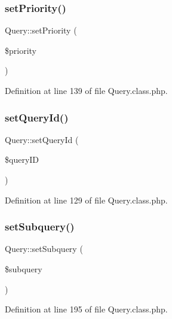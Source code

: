 \hypertarget{classQuery_a6bb27fe96006304e408d51171301c4b9}{}\label{classQuery_a6bb27fe96006304e408d51171301c4b9} 
\subsubsection{\texorpdfstring{set\+Priority()}{setPriority()}}
{\footnotesize\ttfamily Query\+::set\+Priority (\begin{DoxyParamCaption}\item[{}]{\$priority }\end{DoxyParamCaption})}



Definition at line 139 of file Query.\+class.\+php.

\hypertarget{classQuery_aad02b39cd751359208514261f7d320d3}{}\label{classQuery_aad02b39cd751359208514261f7d320d3} 
\subsubsection{\texorpdfstring{set\+Query\+Id()}{setQueryId()}}
{\footnotesize\ttfamily Query\+::set\+Query\+Id (\begin{DoxyParamCaption}\item[{}]{\$query\+ID }\end{DoxyParamCaption})}



Definition at line 129 of file Query.\+class.\+php.

\hypertarget{classQuery_a98af3910bfaf6ed001572c954f28e1a5}{}\label{classQuery_a98af3910bfaf6ed001572c954f28e1a5} 
\subsubsection{\texorpdfstring{set\+Subquery()}{setSubquery()}}
{\footnotesize\ttfamily Query\+::set\+Subquery (\begin{DoxyParamCaption}\item[{}]{\$subquery }\end{DoxyParamCaption})}



Definition at line 195 of file Query.\+class.\+php.

\hypertarget{classQuery_a883baff577719a7108a3acc202d2db00}{}\label{classQuery_a883baff577719a7108a3acc202d2db00} 
